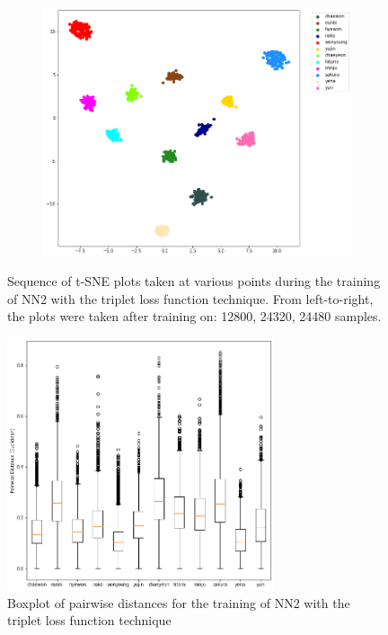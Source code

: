 \begin{enumerate}[left=0pt]
\begin{figure}[htbp]
    \hfill
    \begin{subfigure}{0.325\textwidth}
        \centering
        \includegraphics[trim=30 20 100 0, clip, width=\textwidth]{images/faceReco/nn2-and-triplet/tsne-3.png}     
    \end{subfigure}

    \caption{
        Sequence of t-SNE plots taken at various points during the training of NN2 with the triplet loss function technique.
        From left-to-right, the plots were taken after training on: 12800, 24320, 24480 samples.
    }
    \label{Figure:Face-Recognition:Results:nn2-and-triplet-tsne-sequence}
\end{figure}

\begin{figure}[htbp]
    \centering
    \includegraphics[width=0.7\textwidth]{images/faceReco/nn2-and-triplet/boxplot}
    \caption{Boxplot of pairwise distances for the training of NN2 with the triplet loss function technique}
    \label{Figure:Face-Recognition:Results:nn2-and-triplet-boxplot}
\end{figure}



\end{enumerate}
